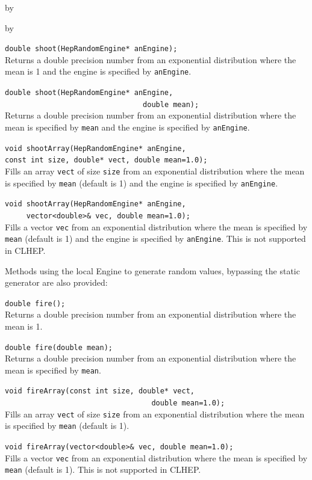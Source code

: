 \documentclass[twoside]{article}
\newcommand{\comp}[1]{\texttt{#1}}%
\newcommand{\entrylabel}[1]{\mbox{\textbf{{#1}}}\hfil}%
\newenvironment{entry}
{\begin{list}{}%
    {\renewcommand{\makelabel}{\entrylabel}%
     \setlength{\labelwidth}{90pt}%
     \setlength{\leftmargin}{\labelwidth}
     \advance\leftmargin by \labelsep%
      }%
    }%
  {\end{list}}
\newcommand{\Entrylabel}[1]%
{\raisebox{0pt}[1ex][0pt]{\makebox[\labelwidth][l]%
    {\parbox[t]{\labelwidth}{\hspace{0pt}\textbf{{#1}}}}}}
\newenvironment{Entry}%
{\renewcommand{\entrylabel}{\Entrylabel}\begin{entry}}%
  {\end{entry}}
\begin{document}
\begin{description}
\begin{Entry}
\begin{Entry}
   \verb+double shoot(HepRandomEngine* anEngine);+\\
   Returns a double precision number from an exponential  distribution where the
   mean is 1 and the engine is specified by \comp{anEngine}.
  
   \verb+double shoot(HepRandomEngine* anEngine,+\\
   \verb+                                double mean);+\\
   Returns a double precision number from an exponential distribution where the
   mean is specified by \comp{mean} and the engine is specified
   by \comp{anEngine}.
  
   \verb+void shootArray(HepRandomEngine* anEngine,+\\
   \verb+const int size, double* vect, double mean=1.0);+\\
   Fills an array \comp{vect} of size \comp{size} from an exponential distribution
   where the mean is specified by \comp{mean} (default is 1) and
   the engine is specified by \comp{anEngine}.

   \verb+void shootArray(HepRandomEngine* anEngine,+\\
   \verb+     vector<double>& vec, double mean=1.0);+\\
   Fills a vector \comp{vec} from an exponential distribution
   where the mean is specified by \comp{mean} (default is 1) and
   the engine is specified by \comp{anEngine}.  This is not supported
   in CLHEP.
   
   Methods using the local Engine to generate random values, bypassing
   the static generator are also provided:

   \verb+double fire();+\\
   Returns a double precision number from an exponential distribution where the
   mean is 1.
  
   \verb+double fire(double mean);+\\
   Returns a double precision number from an exponential distribution where the
   mean is specified by \comp{mean}.

   \verb+void fireArray(const int size, double* vect,+\\
   \verb+                                  double mean=1.0);+\\
   Fills an array \comp{vect} of size \comp{size} from an exponential distribution
   where the mean is specified by \comp{mean} (default is 1).

   \verb+void fireArray(vector<double>& vec, double mean=1.0);+\\
   Fills a vector \comp{vec} from an exponential distribution
   where the mean is specified by \comp{mean} (default is 1).
   This is not supported in CLHEP.


\end{Entry}
\end{Entry}
\end{description}
\end{document}
